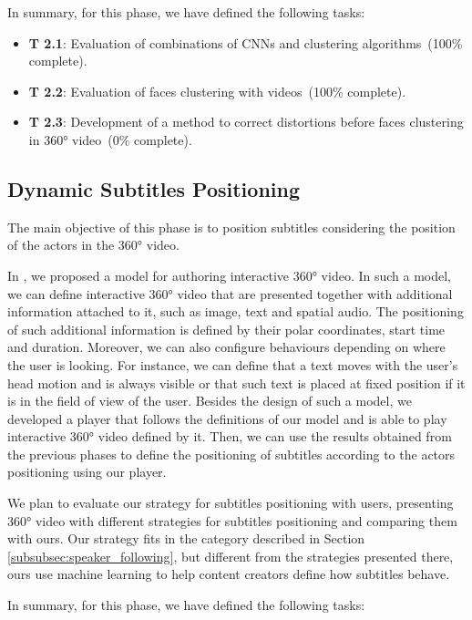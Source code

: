 In summary, for this phase, we have defined the following tasks:


\begin{itemize}
    \item \textbf{T 2.1}: Evaluation of combinations of CNNs and clustering algorithms~(100\% complete).
    \item \textbf{T 2.2}: Evaluation of faces clustering with videos~(100\% complete).
    \item \textbf{T 2.3}: Development of a method to correct distortions before faces clustering in 360° video~(0\% complete).
\end{itemize}


\subsection{Dynamic Subtitles Positioning}

The main objective of this phase is to position subtitles considering the position of the actors in the 360° video.

In \cite{mendes_2020}, we proposed a model for authoring interactive 360° video. In such a model, we can define interactive 360° video that are presented together with additional information attached to it, such as image, text and spatial audio. The positioning of such additional information is defined by their polar coordinates, start time and duration. Moreover, we can also configure behaviours depending on where the user is looking. For instance, we can define that a text moves with the user's head motion and is always visible or that such text is placed at fixed position if it is in the field of view of the user. Besides the design of such a model, we developed a player that follows the definitions of our model and is able to play interactive 360° video defined by it. Then, we can use the results obtained from the previous phases to define the positioning of subtitles according to the actors positioning using our player.

We plan to evaluate our strategy for subtitles positioning with users, presenting 360° video with different strategies for subtitles positioning and comparing them with ours. Our strategy fits in the category described in Section \ref{subsubsec:speaker_following}, but different from the strategies presented there, ours use machine learning to help content creators define how subtitles behave.

In summary, for this phase, we have defined the following tasks:

